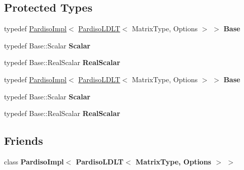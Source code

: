 \subsection*{Protected Types}
\begin{DoxyCompactItemize}
\item 
\mbox{\label{class_eigen_1_1_pardiso_l_d_l_t_a2b656497d36453d2638b6ec7522c1d39}} 
typedef \hyperlink{class_eigen_1_1_pardiso_impl}{Pardiso\+Impl}$<$ \hyperlink{class_eigen_1_1_pardiso_l_d_l_t}{Pardiso\+L\+D\+LT}$<$ Matrix\+Type, Options $>$ $>$ {\bfseries Base}
\item 
\mbox{\label{class_eigen_1_1_pardiso_l_d_l_t_a1185bbdb29c3fd4f89b28f09c559adee}} 
typedef Base\+::\+Scalar {\bfseries Scalar}
\item 
\mbox{\label{class_eigen_1_1_pardiso_l_d_l_t_a0f2b16e45d24849737bcf3bba02ca1c8}} 
typedef Base\+::\+Real\+Scalar {\bfseries Real\+Scalar}
\item 
\mbox{\label{class_eigen_1_1_pardiso_l_d_l_t_a2b656497d36453d2638b6ec7522c1d39}} 
typedef \hyperlink{class_eigen_1_1_pardiso_impl}{Pardiso\+Impl}$<$ \hyperlink{class_eigen_1_1_pardiso_l_d_l_t}{Pardiso\+L\+D\+LT}$<$ Matrix\+Type, Options $>$ $>$ {\bfseries Base}
\item 
\mbox{\label{class_eigen_1_1_pardiso_l_d_l_t_a1185bbdb29c3fd4f89b28f09c559adee}} 
typedef Base\+::\+Scalar {\bfseries Scalar}
\item 
\mbox{\label{class_eigen_1_1_pardiso_l_d_l_t_a0f2b16e45d24849737bcf3bba02ca1c8}} 
typedef Base\+::\+Real\+Scalar {\bfseries Real\+Scalar}
\end{DoxyCompactItemize}
\subsection*{Friends}
\begin{DoxyCompactItemize}
\item 
\mbox{\label{class_eigen_1_1_pardiso_l_d_l_t_a47a1936c390c8845f892507eeeb25426}} 
class {\bfseries Pardiso\+Impl$<$ Pardiso\+L\+D\+L\+T$<$ Matrix\+Type, Options $>$ $>$}
\end{DoxyCompactItemize}
